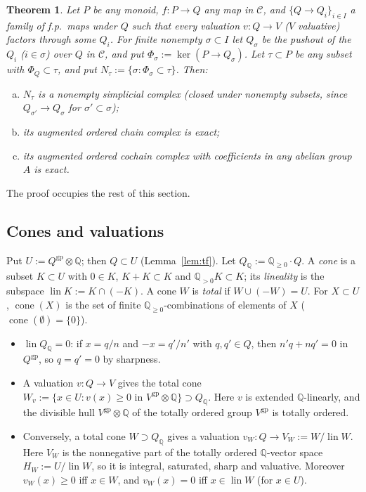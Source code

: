 \documentclass[11pt]{article}
\newtheorem{theorem}{Theorem}[section]
\theoremstyle{definition}
\theoremstyle{remark}
\newcommand{\QQ}{\mathbb{Q}}
\newcommand{\cC}{\mathcal{C}}
\newcommand{\gp}{\mathrm{gp}}
\newcommand{\lin}{\operatorname{lin}}
\newcommand{\cone}{\operatorname{cone}}
\newcommand{\Qrat}{Q_{\QQ}}
\begin{document}
\begin{theorem}\label{thm:D}
Let $P$ be any monoid, $f\colon P\to Q$ any map in $\cC$, and $\{Q\to Q_i\}_{i\in I}$ a family of f.p.\ maps under $Q$ such that every valuation $v\colon Q\to V$ ($V$ valuative) factors through some $Q_i$. For finite nonempty $\sigma\subset I$ let $Q_\sigma$ be the pushout of the $Q_i$ ($i\in\sigma$) over $Q$ in $\cC$, and put $\Phi_\sigma:=\ker(P\to Q_\sigma)$. Let $\tau\subset P$ be any subset with $\Phi_Q\subset\tau$, and put $N_\tau:=\{\sigma:\Phi_\sigma\subset\tau\}$. Then:
\begin{enumerate}[(a)]
\item $N_\tau$ is a nonempty simplicial complex (closed under nonempty subsets, since $Q_{\sigma'}\to Q_\sigma$ for $\sigma'\subset\sigma$);
\item its augmented ordered chain complex is exact;
\item its augmented ordered cochain complex with coefficients in any abelian group $A$ is exact.
\end{enumerate}
\end{theorem}

The proof occupies the rest of this section.

\subsection{Cones and valuations}
Put $U:=Q^{\gp}\otimes\QQ$; then $Q\subset U$ (Lemma~\ref{lem:tf}). Let $\Qrat:=\QQ_{\ge0}\cdot Q$. A \emph{cone} is a subset $K\subset U$ with $0\in K$, $K+K\subset K$ and $\QQ_{>0}K\subset K$; its \emph{lineality} is the subspace $\lin K:=K\cap(-K)$. A cone $W$ is \emph{total} if $W\cup(-W)=U$. For $X\subset U$, $\cone(X)$ is the set of finite $\QQ_{\ge0}$-combinations of elements of $X$ ($\cone(\emptyset)=\{0\}$).
\begin{itemize}
\item $\lin\Qrat=0$: if $x=q/n$ and $-x=q'/n'$ with $q,q'\in Q$, then $n'q+nq'=0$ in $Q^{\gp}$, so $q=q'=0$ by sharpness.
\item A valuation $v\colon Q\to V$ gives the total cone $W_v:=\{x\in U: v(x)\ge0\text{ in }V^{\gp}\otimes\QQ\}\supset\Qrat$. Here $v$ is extended $\QQ$-linearly, and the divisible hull $V^{\gp}\otimes\QQ$ of the totally ordered group $V^{\gp}$ is totally ordered.
\item Conversely, a total cone $W\supset\Qrat$ gives a valuation $v_W\colon Q\to V_W:=W/\lin W$. Here $V_W$ is the nonnegative part of the totally ordered $\QQ$-vector space $H_W:=U/\lin W$, so it is integral, saturated, sharp and valuative. Moreover $v_W(x)\ge0$ iff $x\in W$, and $v_W(x)=0$ iff $x\in\lin W$ (for $x\in U$).
\end{itemize}
\end{document}
